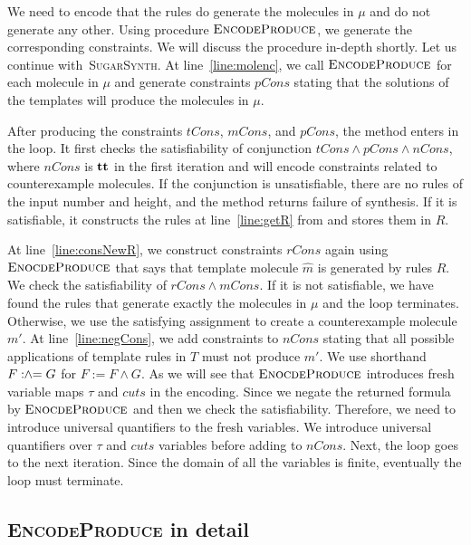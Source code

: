 We need to encode that the rules do generate the molecules
in $\mu$ and do not generate any other.
Using procedure $\textsc{EncodeProduce}$, we generate
the corresponding constraints.
We will discuss the procedure in-depth shortly.
Let us continue with~\textsc{SugarSynth}.
At line~\ref{line:molenc}, we call $\textsc{EncodeProduce}$ for
each molecule in $\mu$ and generate constraints $pCons$ stating that
the solutions of the templates will produce the molecules in $\mu$.

After producing the constraints $tCons$, $mCons$, and $pCons$,
the method enters in the loop.
It first checks the satisfiability of conjunction
$tCons \land pCons \land nCons$, where $nCons$ is $\mathbf{tt}$ in the first iteration
and will encode constraints related to counterexample molecules.
If the conjunction is unsatisfiable, there are no rules of
the input number and height,
and the method returns failure of synthesis.
If it is satisfiable, it constructs the rules at line~\ref{line:getR} from
and stores them in $R$.

At line~\ref{line:consNewR}, we construct constraints $rCons$ again using
$\textsc{EnocdeProduce}$ that says that template molecule $\hat{m}$
is generated by rules $R$.
We check the satisfiability of $rCons \land mCons$.
If it is not satisfiable, we have found the rules that generate exactly
the molecules in $\mu$ and the loop terminates.
Otherwise, we use the satisfying assignment to create a
counterexample molecule $m'$.
At line~\ref{line:negCons}, we add constraints to $nCons$ stating that
all possible applications of template rules in $T$ must not produce $m'$.
We use shorthand $F \mathrel{:\hspace{-3pt}\land\hspace{-3pt}=} G$ for $ F := F \land G$.
As we will see that $\textsc{EnocdeProduce}$ introduces fresh variable
maps $\tau$ and $cuts$ in the encoding.
Since we negate the returned formula by $\textsc{EnocdeProduce}$ 
and then we check the satisfiability.
Therefore, we need to introduce universal quantifiers to the
fresh variables.
We introduce universal quantifiers over $\tau$ and $cuts$
variables before adding to $nCons$.
Next, the loop goes to the next iteration.
Since the domain of all the variables is finite, eventually the loop must
terminate.



\subsection{\textsc{EncodeProduce} in detail}


